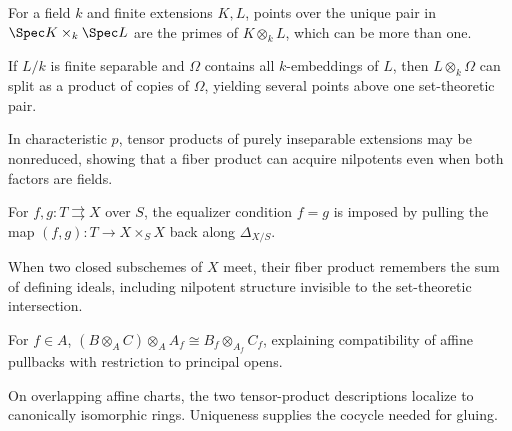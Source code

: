 \begin{example}\label{ex:vi23-a01}
For a field $k$ and finite extensions $K,L$, points over the unique pair in $\Spec K\times_k\Spec L$ are the primes of $K\otimes_kL$, which can be more than one.
\end{example}

\begin{example}\label{ex:vi23-a02}
If $L/k$ is finite separable and $\Omega$ contains all $k$-embeddings of $L$, then $L\otimes_k\Omega$ can split as a product of copies of $\Omega$, yielding several points above one set-theoretic pair.
\end{example}

\begin{example}\label{ex:vi23-a03}
In characteristic $p$, tensor products of purely inseparable extensions may be nonreduced, showing that a fiber product can acquire nilpotents even when both factors are fields.
\end{example}

\begin{example}\label{ex:vi23-a04}
For $f,g:T\rightrightarrows X$ over $S$, the equalizer condition $f=g$ is imposed by pulling the map $(f,g):T\to X\times_SX$ back along $\Delta_{X/S}$.
\end{example}

\begin{example}\label{ex:vi23-a05}
When two closed subschemes of $X$ meet, their fiber product remembers the sum of defining ideals, including nilpotent structure invisible to the set-theoretic intersection.
\end{example}

\begin{example}\label{ex:vi23-a06}
For $f\in A$, $(B\otimes_AC)\otimes_AA_f\cong B_f\otimes_{A_f}C_f$, explaining compatibility of affine pullbacks with restriction to principal opens.
\end{example}

\begin{example}\label{ex:vi23-a07}
On overlapping affine charts, the two tensor-product descriptions localize to canonically isomorphic rings. Uniqueness supplies the cocycle needed for gluing.
\end{example}

